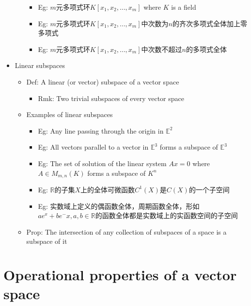 \documentclass[onecolumn]{ctexart}
\begin{document}
\begin{itemize}
\begin{itemize}
\begin{itemize}
      \item Eg: $m$元多项式环$K[x_1, x_2, \ldots, x_m]$ where $K$ is a field
      \item Eg: $m$元多项式环$K[x_1, x_2, \ldots, x_m]$中次数为$n$的齐次多项式全体加上零多项式
      \item Eg: $m$元多项式环$K[x_1, x_2, \ldots, x_m]$中次数不超过$n$的多项式全体
    \end{itemize}
  \end{itemize}
  \item Linear subspaces
  \begin{itemize}
    \item Def: A linear (or vector) subspace of a vector space
    \begin{itemize}
      \item Rmk: Two trivial subspaces of every vector space
    \end{itemize}
    \item Examples of linear subspaces
    \begin{itemize}
      \item Eg: Any line passing through the origin in $\mathbb{E}^2$
      \item Eg: All vectors parallel to a vector in $\mathbb{E}^3$ forms a subspace of $\mathbb{E}^3$
      \item Eg: The set of solution of the linear system $Ax = 0$ where $A \in M_{m,n}(K)$ forms a subspace of $K^n$
      \item Eg: $\mathbb{R}$的子集$X$上的全体可微函数$C^1(X)$是$C(X)$的一个子空间
      \item Eg: 实数域上定义的偶函数全体，周期函数全体，形如$ae^x + be^-x, a,b \in \mathbb{R}$的函数全体都是实数域上的实函数空间的子空间
    \end{itemize}
    \item Prop: The intersection of any collection of subspaces of a space is a subspace of it
  \end{itemize}
\end{itemize}

\section{Operational properties of a vector space}
\end{document}
